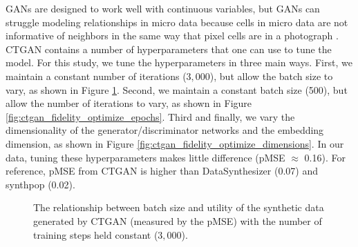 \documentclass[runningheads]{llncs}
\begin{document}
GANs are designed to work well with continuous variables, but GANs can struggle modeling relationships in micro data because cells in micro data are not informative of neighbors in the same way that pixel cells are in a photograph \cite{drechsler202330}.  CTGAN contains a number of hyperparameters that one can use to tune the model.  For this study, we tune the hyperparameters in three main ways.  First, we maintain a constant number of iterations ($3,000$), but allow the batch size to vary, as shown in Figure \ref{fig:ctgan_fidelity_optimize_batch_size}.  Second, we maintain a constant batch size (500), but allow the number of iterations to vary, as shown in Figure \ref{fig:ctgan_fidelity_optimize_epochs}.  Third and finally, we vary the dimensionality of the generator/discriminator networks and the embedding dimension, as shown in Figure \ref{fig:ctgan_fidelity_optimize_dimensions}.  In our data, tuning these hyperparameters makes little difference (pMSE $\approx$ 0.16).  For reference, pMSE from CTGAN is higher than DataSynthesizer (0.07) and synthpop (0.02).

\begin{figure}[t]
    \centering        
   
     \caption{The relationship between batch size and utility of the synthetic data generated by CTGAN (measured by the pMSE) with the number of training steps held constant ($3,000$).}\label{fig:ctgan_fidelity_optimize_batch_size}
     \vspace{-2em}
\end{figure}
\end{document}
